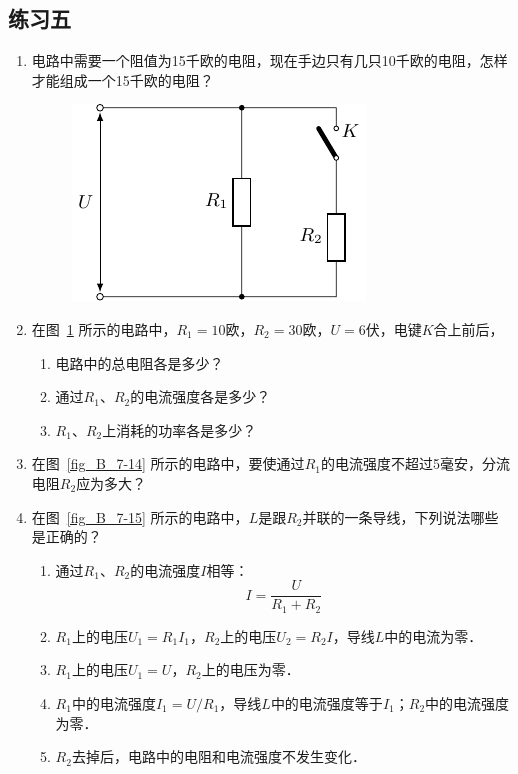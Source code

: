 \subsection*{练习五}
\begin{enumerate}
    \item 电路中需要一个阻值为15千欧的电阻，现在手边只有几只10千欧的电阻，怎样才能组成一个15千欧的电阻？
    \begin{figure}[htbp]
        \centering
        \includegraphics{fig/B/7-13.pdf}
        \caption{}\label{fig_B_7-13}
    \end{figure}
    \item 在图~\ref{fig_B_7-13} 所示的电路中，$R_1=10$欧，$R_2=30$欧，$U=6$伏，电键$K$合上前后，
    \begin{enumerate}
        \item 电路中的总电阻各是多少？
        \item 通过$R_1$、$R_2$的电流强度各是多少？
        \item $R_1$、$R_2$上消耗的功率各是多少？
    \end{enumerate}
    \item 在图~\ref{fig_B_7-14} 所示的电路中，要使通过$R_1$的电流强度不超过5毫安，分流电阻$R_2$应为多大？
    \item 在图~\ref{fig_B_7-15} 所示的电路中，$L$是跟$R_2$并联的一条导线，下列说法哪些是正确的？
    \begin{enumerate}
        \item 通过$R_1$、$R_2$的电流强度$I$相等：
        \[I=\frac{U}{R_1+R_2} \]
        \item $R_1$上的电压$U_1=R_1I_1$，$R_2$上的电压$U_2=R_2I$，导线$L$中的电流为零．
        \item $R_1$上的电压$U_1=U$，$R_2$上的电压为零．
        \item $R_1$中的电流强度$I_1=U/R_1$，导线$L$中的电流强度等于$I_1$；$R_2$中的电流强度为零．
\item $R_2$去掉后，电路中的电阻和电流强度不发生变化．
    \end{enumerate}
\end{enumerate}

